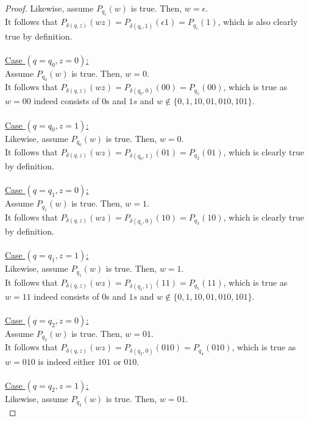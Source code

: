 \documentclass[12pt]{article}
\begin{document}
\begin{proof}
    Likewise, assume $P_{q_{\epsilon}}(w)$ is true. Then, $w = \epsilon$. \\
    It follows that $P_{\delta(q, z)}(wz) = P_{\delta(q_{\epsilon}, 1)}(\epsilon 1) = P_{q_1}(1)$, which is also clearly true by definition. \\
    \\
    \underline{Case $(q = q_0, z = 0)$:} \\
    Assume $P_{q_0}(w)$ is true. Then, $w = 0$. \\
    It follows that $P_{\delta(q, z)}(wz) = P_{\delta(q_0, 0)}(00) = P_{q_5}(00)$, which is true as $w = 00$ indeed consists of $0$s and $1s$ and $w \notin \{0, 1, 10, 01, 010, 101\}$. \\
    \\
    \underline{Case $(q = q_0, z = 1)$:} \\
    Likewise, assume $P_{q_0}(w)$ is true. Then, $w = 0$. \\
    It follows that $P_{\delta(q, z)}(wz) = P_{\delta(q_0, 1)}(01) = P_{q_2}(01)$, which is clearly true by definition. \\
    \\
    \underline{Case $(q = q_1, z = 0)$:} \\
    Assume $P_{q_1}(w)$ is true. Then, $w = 1$. \\
    It follows that $P_{\delta(q, z)}(wz) = P_{\delta(q_1, 0)}(10) = P_{q_3}(10)$, which is clearly true by definition. \\
    \\
    \underline{Case $(q = q_1, z = 1)$:} \\
    Likewise, assume $P_{q_1}(w)$ is true. Then, $w = 1$. \\
    It follows that $P_{\delta(q, z)}(wz) = P_{\delta(q_1, 1)}(11) = P_{q_5}(11)$, which is true as $w = 11$ indeed consists of $0$s and $1s$ and $w \notin \{0, 1, 10, 01, 010, 101\}$. \\
    \\
    \underline{Case $(q = q_2, z = 0)$:} \\
    Assume $P_{q_2}(w)$ is true. Then, $w = 01$. \\
    It follows that $P_{\delta(q, z)}(wz) = P_{\delta(q_2, 0)}(010) = P_{q_4}(010)$, which is true as $w = 010$ is indeed either $101$ or $010$. \\
    \\
    \underline{Case $(q = q_2, z = 1)$:} \\
    Likewise, assume $P_{q_2}(w)$ is true. Then, $w = 01$. \\

\end{proof}
\end{document}
